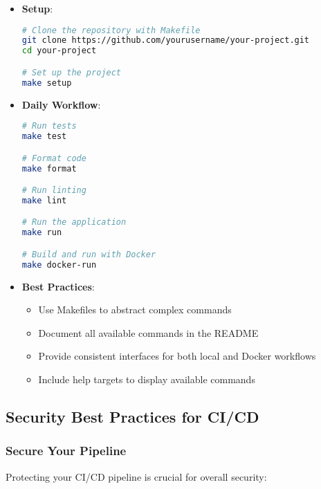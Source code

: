 \begin{itemize}
    \item \textbf{Setup}:
    \begin{lstlisting}[language=bash]
# Clone the repository with Makefile
git clone https://github.com/yourusername/your-project.git
cd your-project

# Set up the project
make setup
    \end{lstlisting}
    
    \item \textbf{Daily Workflow}:
    \begin{lstlisting}[language=bash]
# Run tests
make test

# Format code
make format

# Run linting
make lint

# Run the application
make run

# Build and run with Docker
make docker-run
    \end{lstlisting}
    
    \item \textbf{Best Practices}:
    \begin{itemize}
        \item Use Makefiles to abstract complex commands
        \item Document all available commands in the README
        \item Provide consistent interfaces for both local and Docker workflows
        \item Include help targets to display available commands
    \end{itemize}
\end{itemize}

\subsection{Security Best Practices for CI/CD}

\subsubsection{Secure Your Pipeline}
Protecting your CI/CD pipeline is crucial for overall security:

